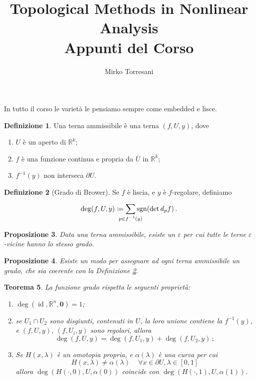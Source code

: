 \documentclass[a4paper, 11pt]{article}
\title{Topological Methods in Nonlinear Analysis \\ Appunti del Corso}
\author{Mirko Torresani}
\theoremstyle{definition}
\newtheorem{Def}{Definizione}
\theoremstyle{plain}
\newtheorem{Prop}[Def]{Proposizione}
\newtheorem{Teo}[Def]{Teorema}
\renewcommand{\epsilon}{\varepsilon}
\newcommand{\zero}{\mathbf{0}}
\newcommand{\R}{\mathbb{R}}
\newcommand{\cl}[1]{\overline{#1}}
\newcommand{\deff}{\coloneqq}
\newcommand{\clapsum}[2]{\sum_{\mathclap{#1}}^{#2}}
\DeclareMathOperator{\sgn}{sgn}
\DeclareMathOperator{\id}{id}
\begin{document}
\maketitle
In tutto il corso le varietà le pensiamo sempre come embedded e lisce. 

\begin{Def}
	Una terna ammissibile è una terna $(f,U,y)$, dove 
	\begin{enumerate}
		\item $U$ è un aperto di $\R^k$;
		\item $f$ è una funzione continua e propria da $\cl{U}$ in $\R^k$;
		\item $f^{-1}(y)$ non interseca $\partial U$.
	\end{enumerate}
\end{Def}

\begin{Def}[Grado di Brower]\label{def:gradoliscio}
	Se $f$ è liscia, e $y$ è $f$-regolare, definiamo 
	\[
		\deg(f,U,y) \deff \clapsum{p \in f^{-1}(y)}{} \sgn (\det d_pf)\,.
	\] 
\end{Def}
\begin{Prop}
	Data una terna ammissibile, esiste un $\epsilon$ per cui tutte le terne $\epsilon$-vicine hanno lo stesso grado.
\end{Prop}
\begin{Prop}
	Esiste un modo per assegnare ad ogni terna ammissibile un grado, che sia coerente con la Definizione \ref{def:gradoliscio}.
\end{Prop}
\begin{Teo}\label{teo:proprietagrado}
	La funzione grado rispetta le seguenti proprietà:
	\begin{enumerate}
		\item $\deg(\id, \R^n, \zero) = 1$;
		\item se $U_1 \cap U_2$ sono disgiunti, contenuti in $U$, la loro unione contiene la $f^{-1}(y)$, e $(f,U,y)$, $(f,U_i,y)$ sono regolari, allora
		\[
			\deg(f,U,y) = \deg(f,U_1,y) + \deg(f,U_2, y)\,;
		\]
		\item Se $H(x, \lambda)$ è un omotopia propria, e $\alpha(\lambda)$ è una curva per cui 
		\[
			H(x,\lambda) \neq \alpha(\lambda)\, \quad \forall x \in \partial U, \lambda \in [0,1]
		\]
		allora $\deg(H(\cdot, 0), U, \alpha(0))$ coincide con $\deg(H(\cdot, 1), U, \alpha(1))$.
	\end{enumerate}
\end{Teo}
\end{document}
